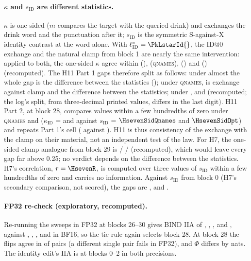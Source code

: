 \paragraph{$\kappa$ and $s_{\mathrm{ID}}$ are different statistics.} $\kappa$ is one-sided ($m$ compares the target with the queried drink) and exchanges the drink word and the punctuation after it; $s_{\mathrm{ID}}$ is the symmetric S-against-X identity contrast at the word alone. With $\ell^*_{\mathrm{ID}} = \PkLstarId{}$, the ID@0 exchange and the natural clamp from block 1 are nearly the same intervention: applied to both, the one-sided $\kappa$ agree within \PkClampAgreeNone{} (\fmtNone{}), \PkClampAgreeQnames{} (\textsc{qnames}), \PkClampAgreeOpt{} (\fmtOpt{}) and \PkClampAgreeLetter{} (\fmtLetter{}) (recomputed). The H11 Part 1 gaps therefore split as follows: under \fmtNone{} almost the whole gap is the difference between the statistics (\PkClampStatGapNone{}); under \textsc{qnames}, \PkClampAgreeQnames{} is exchange against clamp and \PkClampStatGapQnames{} the difference between the statistics; under \fmtOpt{}, \PkClampAgreeOpt{} and \PkClampStatGapOpt{} (recomputed; the log's split, from three-decimal printed values, differs in the last digit). H11 Part 2, at block 28, compares values within a few hundredths of zero under \textsc{qnames} and \fmtOpt{} ($\kappa_{\mathrm{ID}}$ = \PkKappaIdTwentyeightQnames{} and \PkKappaIdTwentyeightOpt{} against $s_{\mathrm{ID}}$ = $\HsevenSidQnames$ and $\HsevenSidOpt$) and repeats Part 1's \fmtNone{} cell (\PkKappaIdTwentyeightNone{} against \HsevenSidNone{}). H11 is thus consistency of the exchange with the clamp on their material, not an independent test of the law. For H7, the one-sided clamp analogue from block 29 is \PkClampKappaNoneTwentynine{} / \PkClampKappaQnamesTwentynine{} / \PkClampKappaOptTwentynine{} (recomputed), which would leave every gap far above 0.25; no verdict depends on the difference between the statistics. H7's correlation, $r = \HsevenR$, is computed over three values of $s_{\mathrm{ID}}$ within a few hundredths of zero and carries no information. Against $s_{\mathrm{ID}}$ from block 0 (H7's secondary comparison, not scored), the gaps are \HsevenGapZeroNone{}, \HsevenGapZeroQnames{} and \HsevenGapZeroOpt{}.

\paragraph{FP32 re-check (exploratory, recomputed).} Re-running the \fmtNone{} sweeps in FP32 at blocks 26--30 gives BIND IIA of \PkFpIIATwentysix{}, \PkFpIIATwentyseven{}, \PkFpIIATwentyeight{}, \PkFpIIATwentynine{} and \PkFpIIAThirty{}, against \PkBfIIATwentysix{}, \PkBfIIATwentyseven{}, \PkBfIIATwentyeight{}, \PkBfIIATwentynine{} and \PkBfIIAThirty{} in BF16, so the tie rule again selects block 28. At block 28 the flips agree in \PkFpAgree{} of pairs (a different single pair fails in FP32), and $\Phi$ differs by \PkFpPhiDiff{} nats. The identity edit's IIA is \PkFpIdIIAMin{} at blocks 0--2 in both precisions.

